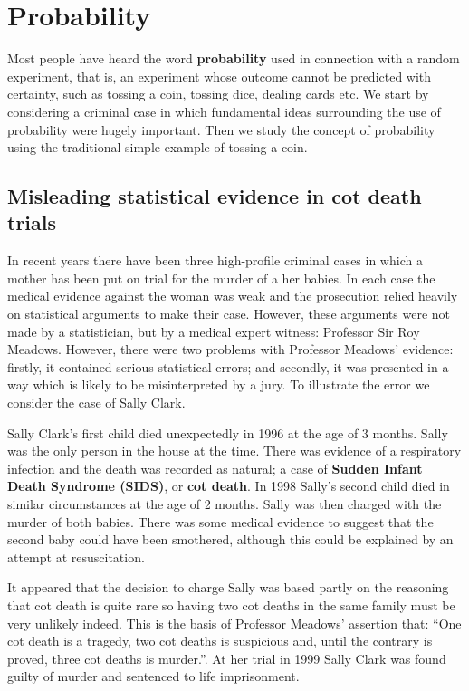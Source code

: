 \documentclass[
  british,
]{book}
\begin{document}
\FloatBarrier

\FloatBarrier

\hypertarget{probability}{%
\chapter{Probability}\label{probability}}

Most people have heard the word \textbf{probability} used in connection with a random experiment, that is, an experiment whose outcome cannot be predicted with certainty, such as tossing a coin, tossing dice, dealing cards etc. We start by considering a criminal case in which fundamental ideas surrounding the use of probability were hugely important. Then we study the concept of probability using the traditional simple example of tossing a coin.

\hypertarget{sids}{%
\section{Misleading statistical evidence in cot death trials}\label{sids}}

In recent years there have been three high-profile criminal cases in which a mother has been put on trial for the murder of a her babies. In each case the medical evidence against the woman was weak and the prosecution relied heavily on statistical arguments to make their case. However, these arguments were not made by a statistician, but by a medical expert witness: Professor Sir Roy Meadows. However, there were two problems with Professor Meadows' evidence: firstly, it contained serious statistical errors; and secondly, it was presented in a way which is likely to be misinterpreted by a jury. To illustrate the error we consider the case of Sally Clark.

Sally Clark's first child died unexpectedly in 1996 at the age of 3 months. Sally was the only person in the house at the time. There was evidence of a respiratory infection and the death was recorded as natural; a case of \textbf{Sudden Infant Death Syndrome (SIDS)}, or \textbf{cot death}. In 1998 Sally's second child died in similar circumstances at the age of 2 months. Sally was then charged with the murder of both babies. There was some medical evidence to suggest that the second baby could have been smothered, although this could be explained by an attempt at resuscitation.

It appeared that the decision to charge Sally was based partly on the reasoning that cot death is quite rare so having two cot deaths in the same family must be very unlikely indeed. This is the basis of Professor Meadows' assertion that: ``One cot death is a tragedy, two cot deaths is suspicious and, until the contrary is proved, three cot deaths is murder.''. At her trial in 1999 Sally Clark was found guilty of murder and sentenced to life imprisonment.
\end{document}

